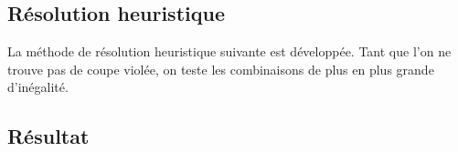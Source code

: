 \documentclass[12pt]{report}
\begin{document}
\subsection{Résolution heuristique}
La méthode de résolution heuristique suivante est développée. Tant que l'on ne trouve pas de coupe violée, on teste les combinaisons de plus en plus grande d'inégalité.
\subsection{Résultat}




\end{document}
